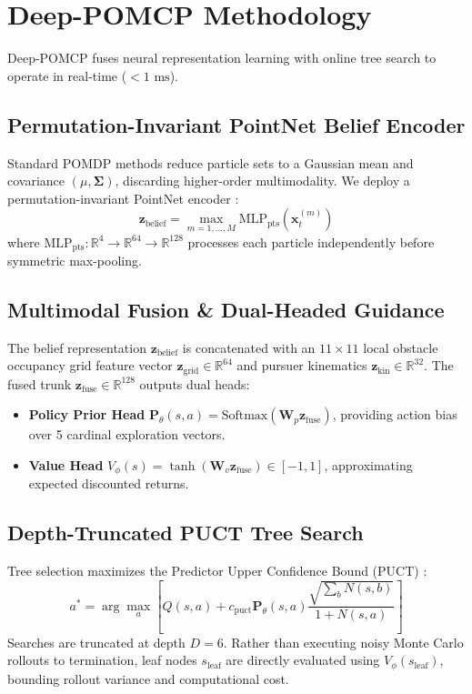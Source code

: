 \documentclass[conference]{IEEEtran}
\begin{document}
\section{Deep-POMCP Methodology}
Deep-POMCP fuses neural representation learning with online tree search to operate in real-time ($<1\text{ ms}$).

\subsection{Permutation-Invariant PointNet Belief Encoder}
Standard POMDP methods reduce particle sets to a Gaussian mean and covariance $(\mu, \mathbf{\Sigma})$, discarding higher-order multimodality. We deploy a permutation-invariant PointNet encoder \cite{qi2017pointnet}:
\begin{equation}
    \mathbf{z}_{\text{belief}} = \max_{m=1, \dots, M} \text{MLP}_{\text{pts}}(\mathbf{x}_t^{(m)})
\end{equation}
where $\text{MLP}_{\text{pts}}: \mathbb{R}^4 \to \mathbb{R}^{64} \to \mathbb{R}^{128}$ processes each particle independently before symmetric max-pooling.

\subsection{Multimodal Fusion & Dual-Headed Guidance}
The belief representation $\mathbf{z}_{\text{belief}}$ is concatenated with an $11 \times 11$ local obstacle occupancy grid feature vector $\mathbf{z}_{\text{grid}} \in \mathbb{R}^{64}$ and pursuer kinematics $\mathbf{z}_{\text{kin}} \in \mathbb{R}^{32}$. The fused trunk $\mathbf{z}_{\text{fuse}} \in \mathbb{R}^{128}$ outputs dual heads:
\begin{itemize}
    \item \textbf{Policy Prior Head} $\mathbf{P}_\theta(s, a) = \text{Softmax}(\mathbf{W}_p \mathbf{z}_{\text{fuse}})$, providing action bias over 5 cardinal exploration vectors.
    \item \textbf{Value Head} $V_\phi(s) = \tanh(\mathbf{W}_v \mathbf{z}_{\text{fuse}}) \in [-1, 1]$, approximating expected discounted returns.
\end{itemize}

\subsection{Depth-Truncated PUCT Tree Search}
Tree selection maximizes the Predictor Upper Confidence Bound (PUCT) \cite{kocsis2006bandit}:
\begin{equation}
    a^* = \arg\max_{a} \left[ Q(s, a) + c_{\text{puct}} \mathbf{P}_\theta(s, a) \frac{\sqrt{\sum_b N(s, b)}}{1 + N(s, a)} \right]
\end{equation}
Searches are truncated at depth $D = 6$. Rather than executing noisy Monte Carlo rollouts to termination, leaf nodes $s_{\text{leaf}}$ are directly evaluated using $V_\phi(s_{\text{leaf}})$, bounding rollout variance and computational cost.
\end{document}

